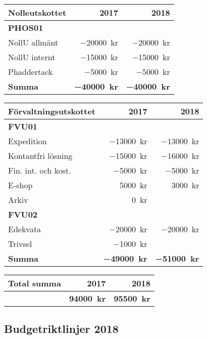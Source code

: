 \documentclass[../_main/handlingar.tex]{subfiles}
\begin{document}
\begin{tabularx}{10cm}{X r r}
    \textbf{\large Nolleutskottet} & \textbf{2017} & \textbf{2018} \\
    \hline
    \textbf{PHOS01} \\
    NollU allmänt & \SI{-20000}{kr} & \SI{-20000}{kr} \\
    NollU internt & \SI{-15000}{kr} & \SI{-15000}{kr} \\
    Phaddertack & \SI{-5000}{kr} & \SI{-5000}{kr} \\
    \hline
    \textbf{Summa} & \textbf{\SI{-40000}{kr}} & \textbf{\SI{-40000}{kr}} \\
\end{tabularx}

\begin{tabularx}{9cm}{X r r}
    \textbf{\large Förvaltningsutskottet} & \textbf{2017} & \textbf{2018} \\
    \hline
    \textbf{FVU01} \\
    Expedition & \SI{-13000}{kr} & \SI{-13000}{kr} \\
    Kontantfri lösning & \SI{-15000}{kr} & \SI{-16000}{kr} \\
    Fin. int. och kost. & \SI{-5000}{kr} & \SI{-5000}{kr} \\
    E-shop & \SI{5000}{kr} & \SI{3000}{kr} \\
    Arkiv & \SI{0}{kr} & \\
    \textbf{FVU02} \\
    Edekvata & \SI{-20000}{kr} & \SI{-20000}{kr} \\
    Trivsel & \SI{-1000}{kr} & \\
    \hline
    \textbf{Summa} & \textbf{\SI{-49000}{kr}} & \textbf{\SI{-51000}{kr}} \\
\end{tabularx}

\begin{tabularx}{9cm}{X r r}
    \textbf{\large Total summa} & \textbf{2017} & \textbf{2018} \\
    \hline
     & \textbf{\SI{94000}{kr}} & \textbf{\SI{95500}{kr}} \\
\end{tabularx}


\newpage
\subsection*{Budgetriktlinjer 2018}
\end{document}

